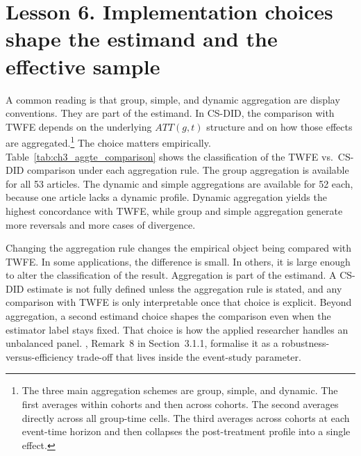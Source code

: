 




\newpage
\section{Lesson 6. Implementation choices shape the estimand and the effective sample}

A common reading is that group, simple, and dynamic aggregation are display conventions. They are part of the estimand. In CS-DID, the comparison with TWFE depends on the underlying \(ATT(g,t)\) structure and on how those effects are aggregated.\footnote{The three main aggregation schemes are group, simple, and dynamic. The first averages within cohorts and then across cohorts. The second averages directly across all group-time cells. The third averages across cohorts at each event-time horizon and then collapses the post-treatment profile into a single effect.} The choice matters empirically. Table~\ref{tab:ch3_aggte_comparison} shows the classification of the TWFE vs.\ CS-DID comparison under each aggregation rule. The group aggregation is available for all 53 articles. The dynamic and simple aggregations are available for 52 each, because one article lacks a dynamic profile. Dynamic aggregation yields the highest concordance with TWFE, while group and simple aggregation generate more reversals and more cases of divergence.

Changing the aggregation rule changes the empirical object being compared with TWFE. In some applications, the difference is small. In others, it is large enough to alter the classification of the result. Aggregation is part of the estimand. A CS-DID estimate is not fully defined unless the aggregation rule is stated, and any comparison with TWFE is only interpretable once that choice is explicit. Beyond aggregation, a second estimand choice shapes the comparison even when the estimator label stays fixed. That choice is how the applied researcher handles an unbalanced panel. \textcite{callaway2021difference}, Remark~8 in Section~3.1.1, formalise it as a robustness-versus-efficiency trade-off that lives inside the event-study parameter.







